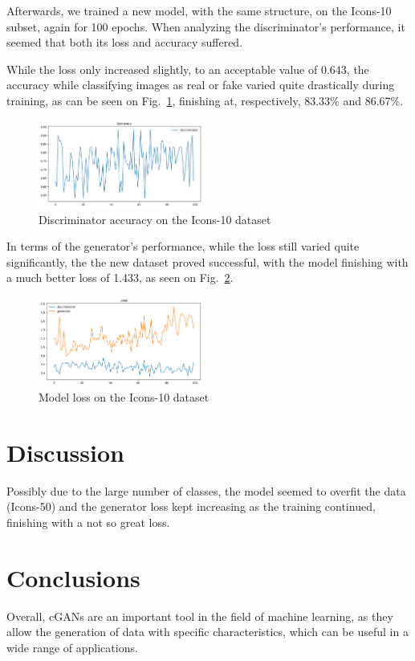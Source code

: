 \documentclass[conference]{IEEEtran}
\begin{document}
Afterwards, we trained a new model, with the same structure, on the Icons-10 subset, again for 100 epochs. When analyzing the discriminator's performance, it seemed that both its loss and accuracy suffered. 

While the loss only increased slightly, to an acceptable value of 0.643, the accuracy while classifying images as real or fake varied quite drastically during training, as can be seen on Fig.~\ref{fig:Icons10Acc}, finishing at, respectively, 83.33\% and 86.67\%.

\begin{figure}[htbp]
    \centering
    \includegraphics[width=0.48\textwidth]{paper/images/icons10/icons10_acc.png}
    \caption{Discriminator accuracy on the Icons-10 dataset}
    \label{fig:Icons10Acc}
\end{figure}

In terms of the generator's performance, while the loss still varied quite significantly, the the new dataset proved successful, with the model finishing with a much better loss of 1.433, as seen on Fig.~\ref{fig:Icons10Loss}.

\begin{figure}[htbp]
    \centering
    \includegraphics[width=0.48\textwidth]{paper/images/icons10/icons10_loss.png}
    \caption{Model loss on the Icons-10 dataset}
    \label{fig:Icons10Loss}
\end{figure}

\section{Discussion}

 Possibly due to the large number of classes, the model seemed to overfit the data (Icons-50) and the generator loss kept increasing as the training continued, finishing with a not so great loss.
 
\section{Conclusions}
Overall, cGANs are an important tool in the field of machine learning, as they allow the generation of data with specific characteristics, which can be useful in a wide range of applications.



\end{document}
